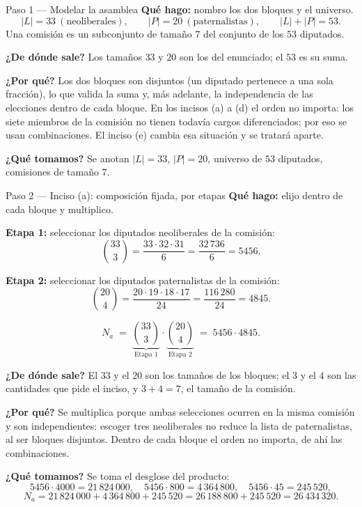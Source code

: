 \documentclass[11pt]{article}
\begin{document}
\begin{paso}{Paso 1 --- Modelar la asamblea}
\textbf{Qué hago:} nombro los dos bloques y el universo.
\[
  |L| = 33 \ (\text{neoliberales}),\qquad |P| = 20 \ (\text{paternalistas}),\qquad |L|+|P| = 53 .
\]
Una comisión es un subconjunto de tamaño $7$ del conjunto de los $53$ diputados.

\textbf{¿De dónde sale?} Los tamaños $33$ y $20$ son los del enunciado; el $53$ es su suma.

\textbf{¿Por qué?} Los dos bloques son disjuntos (un diputado pertenece a una sola fracción), lo que valida la suma y, más adelante, la independencia de las elecciones dentro de cada bloque. En los incisos (a) a (d) el orden no importa: los siete miembros de la comisión no tienen todavía cargos diferenciados; por eso se usan combinaciones. El inciso (e) cambia esa situación y se tratará aparte.

\textbf{¿Qué tomamos?} Se anotan $|L|=33$, $|P|=20$, universo de $53$ diputados, comisiones de tamaño $7$.
\end{paso}

\begin{paso}{Paso 2 --- Inciso (a): composición fijada, por etapas}
\textbf{Qué hago:} elijo dentro de cada bloque y multiplico.

\medskip
\textbf{Etapa 1:} seleccionar los diputados neoliberales de la comisión:
\[
  \binom{33}{3}=\frac{33\cdot 32\cdot 31}{6} = \frac{32\,736}{6} = 5456 .
\]

\textbf{Etapa 2:} seleccionar los diputados paternalistas de la comisión:
\[
  \binom{20}{4}=\frac{20\cdot 19\cdot 18\cdot 17}{24} = \frac{116\,280}{24} = 4845 .
\]

\medskip
\[
  N_a \;=\; \underbrace{\binom{33}{3}}_{\text{Etapa 1}}\cdot \underbrace{\binom{20}{4}}_{\text{Etapa 2}} \;=\; 5456\cdot 4845 .
\]

\textbf{¿De dónde sale?} El $33$ y el $20$ son los tamaños de los bloques; el $3$ y el $4$ son las cantidades que pide el inciso, y $3+4=7$, el tamaño de la comisión.

\textbf{¿Por qué?} Se multiplica porque ambas selecciones ocurren en la misma comisión y son independientes: escoger tres neoliberales no reduce la lista de paternalistas, al ser bloques disjuntos. Dentro de cada bloque el orden no importa, de ahí las combinaciones.

\textbf{¿Qué tomamos?} Se toma el desglose del producto:
\[
  5456\cdot 4000 = 21\,824\,000,\quad 5456\cdot 800 = 4\,364\,800,\quad 5456\cdot 45 = 245\,520 ,
\]
\[
  N_a = 21\,824\,000+4\,364\,800+245\,520 = 26\,188\,800+245\,520 = 26\,434\,320 .
\]
\end{paso}
\end{document}
